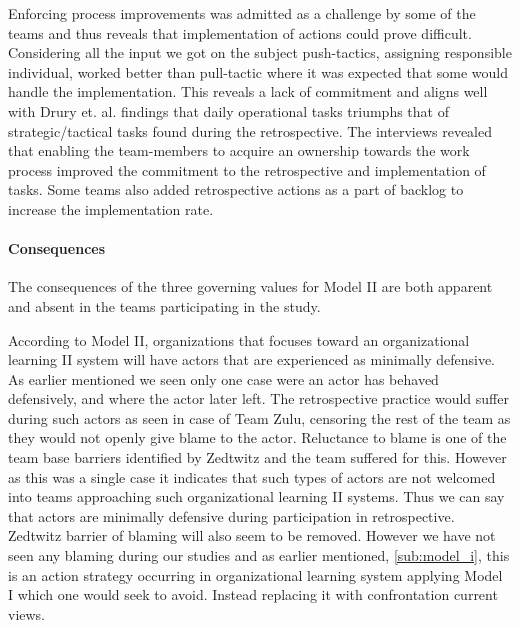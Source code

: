 Enforcing process improvements was admitted as a challenge by some of the teams and thus reveals that implementation of actions could prove difficult. Considering all the input we got on the subject push-tactics, assigning responsible individual, worked better than pull-tactic where it was expected that some would handle the implementation. This reveals a lack of commitment and aligns well with Drury et. al. \cite{Drury2012} findings that daily operational tasks triumphs that of strategic/tactical tasks found during the retrospective. The interviews revealed that enabling the team-members to acquire an ownership towards the work process improved the commitment to the retrospective and implementation of tasks. Some teams also added retrospective actions as a part of backlog to increase the implementation rate. 

\paragraph{Consequences}
The consequences of the three governing values for Model II are both apparent and absent in the teams participating in the study.

According to Model II, organizations that focuses toward an organizational learning II system will have actors that are experienced as minimally defensive. As earlier mentioned we seen only one case were an actor has behaved defensively, and where the actor later left. The retrospective practice would suffer during such actors as seen in case of Team Zulu, censoring the rest of the team as they would not openly give blame to the actor. Reluctance to blame is one of the team base barriers identified by Zedtwitz\cite{Zedtwitz2002} and the team suffered for this. However as this was a single case it indicates that such types of actors are not welcomed into teams approaching such organizational learning II systems. Thus we can say that actors are minimally defensive during participation in retrospective. Zedtwitz barrier of blaming will also seem to be removed. However we have not seen any blaming during our studies and as earlier mentioned, \autoref{sub:model_i}, this is an action strategy occurring in organizational learning system applying Model I which one would seek to avoid. Instead replacing it with confrontation current views. 


